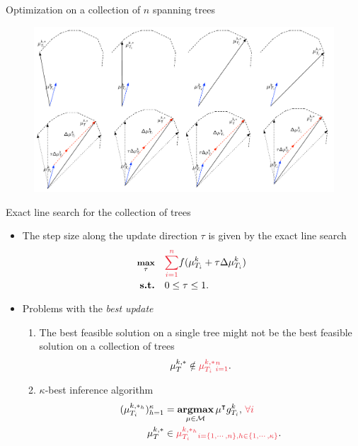 \documentclass[first=dgreen,second=purple,logo=yellowexc]{aaltoslides}
\begin{document}
\begin{frame}{Optimization on a collection of $n$ spanning trees}
	\begin{figure}
		\begin{center}
			\includegraphics[scale=0.3]{best_update.pdf}
		\end{center}
	\end{figure}
\end{frame}

\begin{frame}{Exact line search for the collection of trees}
	\begin{itemize}
		\item The step size along the update direction $\tau$ is given by the exact line search
		\begin{align*}\footnotesize
			\underset{\tau}{\maximize} &\quad {\color{aaltored}\sum_{i=1}^n}f(\vmu_{T_i}^k + \tau\Delta\vmu_{T_i}^{k})\\
			\st &\quad 0\le\tau\le1.
		\end{align*}
		\item Problems with the {\em best update}
		\begin{enumerate}\footnotesize
			\item The best feasible solution on a single tree might not be the best feasible solution on a collection of trees
			\begin{align*}
				{\vmu}_{T}^{k,*}\notin{\color{aaltored}{}{\vmu}_{T_i}^{k,*}{\color{aaltored}}_{i=1}^n}.
			\end{align*}
			\item $\kappa$-best inference algorithm
			\begin{align*}
				({\vmu}_{T_i}^{k,*_h})_{h=1}^{\kappa} &= \underset{\vmu\in\Mcal}{\argmax}\,\vmu\tp g_{T_i}^k,\,{\color{aaltored}\forall i}\\
				{\vmu}_{T}^{k,*} &\in {\color{aaltored}{}{\vmu}_{T_i}^{k,*_h}{\color{aaltored}}_{i=\{1,\cdots,n\},h\in\{1,\cdots,\kappa\}}}.
			\end{align*}
		\end{enumerate}
	\end{itemize}
\end{frame}
\end{document}
